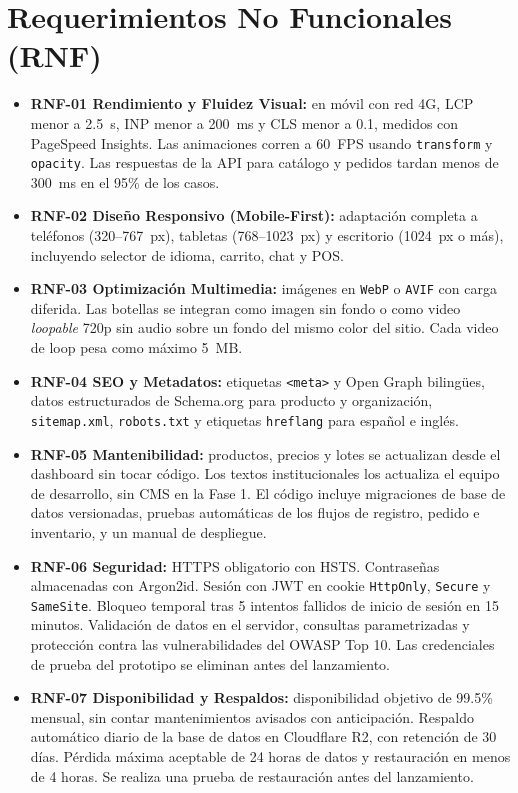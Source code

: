 \documentclass[11pt,letterpaper]{article}
\begin{document}
\section{Requerimientos No Funcionales (RNF)}
\begin{itemize}[leftmargin=1.5em]
    \item \textbf{RNF-01 Rendimiento y Fluidez Visual:} en móvil con red 4G, LCP menor a 2.5~s, INP menor a 200~ms y CLS menor a 0.1, medidos con PageSpeed Insights. Las animaciones corren a 60~FPS usando \texttt{transform} y \texttt{opacity}. Las respuestas de la API para catálogo y pedidos tardan menos de 300~ms en el 95\% de los casos.
    \item \textbf{RNF-02 Diseño Responsivo (Mobile-First):} adaptación completa a teléfonos (320--767~px), tabletas (768--1023~px) y escritorio (1024~px o más), incluyendo selector de idioma, carrito, chat y POS.
    \item \textbf{RNF-03 Optimización Multimedia:} imágenes en \texttt{WebP} o \texttt{AVIF} con carga diferida. Las botellas se integran como imagen sin fondo o como video \textit{loopable} 720p sin audio sobre un fondo del mismo color del sitio. Cada video de loop pesa como máximo 5~MB.
    \item \textbf{RNF-04 SEO y Metadatos:} etiquetas \texttt{<meta>} y Open Graph bilingües, datos estructurados de Schema.org para producto y organización, \texttt{sitemap.xml}, \texttt{robots.txt} y etiquetas \texttt{hreflang} para español e inglés.
    \item \textbf{RNF-05 Mantenibilidad:} productos, precios y lotes se actualizan desde el dashboard sin tocar código. Los textos institucionales los actualiza el equipo de desarrollo, sin CMS en la Fase 1. El código incluye migraciones de base de datos versionadas, pruebas automáticas de los flujos de registro, pedido e inventario, y un manual de despliegue.
    \item \textbf{RNF-06 Seguridad:} HTTPS obligatorio con HSTS. Contraseñas almacenadas con Argon2id. Sesión con JWT en cookie \texttt{HttpOnly}, \texttt{Secure} y \texttt{SameSite}. Bloqueo temporal tras 5 intentos fallidos de inicio de sesión en 15 minutos. Validación de datos en el servidor, consultas parametrizadas y protección contra las vulnerabilidades del OWASP Top 10. Las credenciales de prueba del prototipo se eliminan antes del lanzamiento.
    \item \textbf{RNF-07 Disponibilidad y Respaldos:} disponibilidad objetivo de 99.5\% mensual, sin contar mantenimientos avisados con anticipación. Respaldo automático diario de la base de datos en Cloudflare R2, con retención de 30 días. Pérdida máxima aceptable de 24 horas de datos y restauración en menos de 4 horas. Se realiza una prueba de restauración antes del lanzamiento.

\end{itemize}
\end{document}
